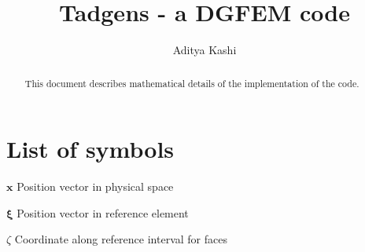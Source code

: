 \documentclass[11pt]{article}
\title{Tadgens - a DGFEM code}
\author{Aditya Kashi}
\let\bld\boldsymbol
\begin{document}
\maketitle
\begin{abstract}
	This document describes mathematical details of the implementation of the code.
\end{abstract}

\section*{List of symbols}

\begin{description}
\item $\bld{x}$ Position vector in physical space
\item $\bld{\xi}$ Position vector in reference element
\item $\zeta$ Coordinate along reference interval for faces
\end{description}


\end{document}
